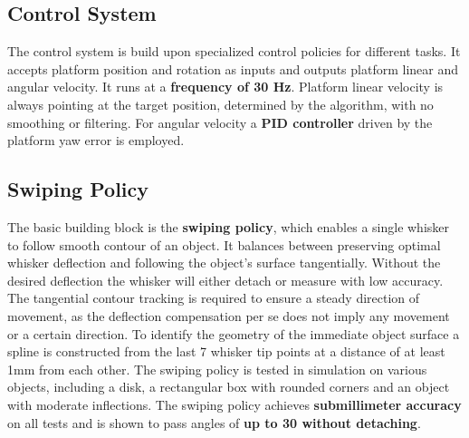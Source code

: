 \subsection{Control System}
The control system is build upon specialized control policies for different tasks.
It accepts platform position and rotation as inputs and outputs platform linear and angular velocity.
It runs at a \textbf{frequency of 30 Hz}.
Platform linear velocity is always pointing at the target position, determined by the algorithm, with no smoothing or filtering.
For angular velocity a \textbf{PID controller} driven by the platform yaw error is employed.

\subsection{Swiping Policy}
The basic building block is the \textbf{swiping policy}, which enables a single whisker to follow smooth contour of an object.
It balances between preserving optimal whisker deflection and following the object's surface tangentially.
Without the desired deflection the whisker will either detach or measure with low accuracy.
The tangential contour tracking is required to ensure a steady direction of movement, as the deflection compensation per se does not imply any movement or a certain direction.
To identify the geometry of the immediate object surface a spline is constructed from the last 7 whisker tip points at a distance of at least 1mm from each other.
The swiping policy is tested in simulation on various objects, including a disk, a rectangular box with rounded corners and an object with moderate inflections.
The swiping policy achieves \textbf{submillimeter accuracy} on all tests and is shown to pass angles of \textbf{up to 30\degree{} without detaching}.

